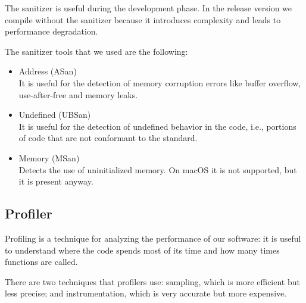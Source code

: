 The sanitizer is useful during the development phase. In the release version we compile without the sanitizer because it introduces complexity and leads to performance degradation.

\myskip

The sanitizer tools that we used are the following:
\begin{itemize}
    \item Address (ASan) \\
        It is useful for the detection of memory corruption errors like buffer overflow, use-after-free and memory leaks.
    \item Undefined (UBSan) \\
        It is useful for the detection of undefined behavior in the code, i.e., portions of code that are not conformant to the standard.
    \item Memory (MSan) \\
        Detects the use of uninitialized memory. On macOS it is not supported, but it is present anyway.
\end{itemize}

\subsection{Profiler}
\label{sec:profiler}
Profiling is a technique for analyzing the performance of our software: it is useful to understand where the code spends most of its time and how many times functions are called.

There are two techniques that profilers use: sampling, which is more efficient but less precise; and instrumentation, which is very accurate but more expensive.

